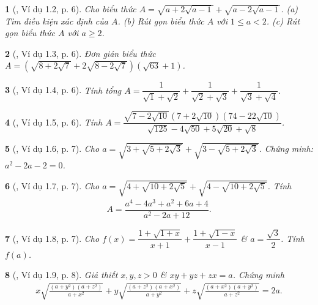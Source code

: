\documentclass{article}
\newtheorem{baitoan}{}
\begin{document}
\begin{baitoan}[\cite{TLCT_THCS_Toan_9_dai_so}, Ví dụ 1.2, p. 6]
	Cho biểu thức $A = \sqrt{a + 2\sqrt{a - 1}} + \sqrt{a - 2\sqrt{a - 1}}$. (a) Tìm điều kiện xác định của $A$. (b) Rút gọn biểu thức $A$ với $1\le a < 2$. (c) Rút gọn biểu thức $A$ với $a\ge2$.
\end{baitoan}

\begin{baitoan}[\cite{TLCT_THCS_Toan_9_dai_so}, Ví dụ 1.3, p. 6]
	Đơn giản biểu thức $A = \left(\sqrt{8 + 2\sqrt{7}} + 2\sqrt{8 - 2\sqrt{7}}\right)(\sqrt{63} + 1)$.
\end{baitoan}

\begin{baitoan}[\cite{TLCT_THCS_Toan_9_dai_so}, Ví dụ 1.4, p. 6]
	Tính tổng $A = \dfrac{1}{\sqrt{1} + \sqrt{2}} + \dfrac{1}{\sqrt{2} + \sqrt{3}} + \dfrac{1}{\sqrt{3} + \sqrt{4}}$.
\end{baitoan}

\begin{baitoan}[\cite{TLCT_THCS_Toan_9_dai_so}, Ví dụ 1.5, p. 6]
	Tính $A = \dfrac{\sqrt{7 - 2\sqrt{10}}(7 + 2\sqrt{10})(74 - 22\sqrt{10})}{\sqrt{125} - 4\sqrt{50} + 5\sqrt{20} + \sqrt{8}}$.
\end{baitoan}

\begin{baitoan}[\cite{TLCT_THCS_Toan_9_dai_so}, Ví dụ 1.6, p. 7]
	Cho $a = \sqrt{3 + \sqrt{5 + 2\sqrt{3}}} + \sqrt{3 - \sqrt{5 + 2\sqrt{3}}}$. Chứng minh: $a^2 - 2a - 2 = 0$.
\end{baitoan}

\begin{baitoan}[\cite{TLCT_THCS_Toan_9_dai_so}, Ví dụ 1.7, p. 7]
	Cho $a = \sqrt{4 + \sqrt{10 + 2\sqrt{5}}} + \sqrt{4 - \sqrt{10 + 2\sqrt{5}}}$. Tính
	\begin{align*}
		A = \dfrac{a^4 - 4a^3 + a^2 + 6a + 4}{a^2 - 2a + 12}.
	\end{align*}
\end{baitoan}

\begin{baitoan}[\cite{TLCT_THCS_Toan_9_dai_so}, Ví dụ 1.8, p. 7]
	Cho $f(x) = \dfrac{1 + \sqrt{1 + x}}{x + 1} + \dfrac{1 + \sqrt{1 - x}}{x - 1}$ \& $a = \dfrac{\sqrt{3}}{2}$. Tính $f(a)$.
\end{baitoan}

\begin{baitoan}[\cite{TLCT_THCS_Toan_9_dai_so}, Ví dụ 1.9, p. 8]
	Giả thiết $x,y,z > 0$ \& $xy + yz + zx = a$. Chứng minh
	\begin{align*}
		x\sqrt{\frac{(a + y^2)(a + z^2)}{a + x^2}} + y\sqrt{\frac{(a + z^2)(a + x^2)}{a + y^2}} + z\sqrt{\frac{(a + x^2)(a + y^2)}{a + z^2}} = 2a.
	\end{align*}
\end{baitoan}
\end{document}
